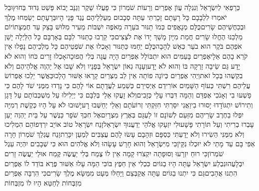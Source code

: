 \documentclass[../main/main.tex]{subfiles}
\begin{document}
\begin{multicols*}{\ncols}
כְּרָפְאִי לְיִשְׂרָאֵל וְנִגְלָה עֲוֺן אֶפְרַיִם וְרָעוֹת שֹׁמְרוֹן כִּי פָעֲלוּ שָׁקֶר וְגַנָּב יָבוֹא פָּשַׁט גְּדוּד בַּחוּץ\PreVerseSpace{}וּבַל יֹאמְרוּ לִלְבָבָם כָּל רָעָתָם זָכָרְתִּי עַתָּה סְבָבוּם מַעַלְלֵיהֶם נֶגֶד פָּנַי הָיוּ\PreVerseSpace{}בְּרָעָתָם יְשַׂמְּחוּ מֶלֶךְ וּבְכַחֲשֵׁיהֶם שָׂרִים\PreVerseSpace{}כֻּלָּם מְנָאֲפִים כְּמוֹ תַנּוּר בֹּעֵרָה מֵאֹפֶה יִשְׁבּוֹת מֵעִיר מִלּוּשׁ בָּצֵק עַד חֻמְצָתוֹ\PreVerseSpace{}יוֹם מַלְכֵּנוּ הֶחֱלוּ שָׂרִים חֲמַת מִיָּיִן מָשַׁךְ יָדוֹ אֶת לֹצְצִים\PreVerseSpace{}כִּי קֵרְבוּ כַתַּנּוּר לִבָּם בְּאָרְבָּם כָּל הַלַּיְלָה יָשֵׁן אֹפֵהֶם בֹּקֶר הוּא בֹעֵר כְּאֵשׁ לֶהָבָה\PreVerseSpace{}כֻּלָּם יֵחַמּוּ כַּתַּנּוּר וְאָכְלוּ אֶת שֹׁפְטֵיהֶם כָּל מַלְכֵיהֶם נָפָלוּ אֵין קֹרֵא בָהֶם אֵלָי\PreVerseSpace{}אֶפְרַיִם בָּעַמִּים הוּא יִתְבּוֹלָל אֶפְרַיִם הָיָה עֻגָה בְּלִי הֲפוּכָה\PreVerseSpace{}אָכְלוּ זָרִים כֹּחוֹ וְהוּא לֹא יָדָע גַּם שֵׂיבָה זָרְקָה בּוֹ וְהוּא לֹא יָדָע\PreVerseSpace{}וְעָנָה גְאוֹן יִשְׂרָאֵל בְּפָנָיו וְלֹא שָׁבוּ אֶל יַהְוֶה אֱלֹהֵיהֶם וְלֹא בִקְשֻׁהוּ בְּכָל זֹאת\PreVerseSpace{}וַיְהִי אֶפְרַיִם כְּיוֹנָה פוֹתָה אֵין לֵב מִצְרַיִם קָרָאוּ אַשּׁוּר הָלָכוּ\PreVerseSpace{}כַּאֲשֶׁר יֵלֵכוּ אֶפְרוֹשׂ עֲלֵיהֶם רִשְׁתִּי כְּעוֹף הַשָּׁמַיִם אוֹרִידֵם אַיְסִירֵם כְּשֵׁמַע לַעֲדָתָם \ClosedSection{}אוֹי לָהֶם כִּי נָדְדוּ מִמֶּנִּי שֹׁד לָהֶם כִּי פָשְׁעוּ בִי וְאָנֹכִי אֶפְדֵּם וְהֵמָּה דִּבְּרוּ עָלַי כְּזָבִים\PreVerseSpace{}וְלֹא זָעֲקוּ אֵלַי בְּלִבָּם כִּי יְיֵלִילוּ עַל מִשְׁכְּבוֹתָם עַל דָּגָן וְתִירוֹשׁ יִתְגּוֹדָדוּ\SubEnd{} יָסוּרוּ בִי\PreVerseSpace{}וַאֲנִי יִסַּרְתִּי חִזַּקְתִּי זְרוֹעֹתָם וְאֵלַי יְחַשְּׁבוּ רָע\PreVerseSpace{}יָשׁוּבוּ לֹא עָל הָיוּ כְּקֶשֶׁת רְמִיָּה יִפְּלוּ בַחֶרֶב שָׂרֵיהֶם מִזַּעַם לְשׁוֹנָם זוֹ לַעְגָּם בְּאֶרֶץ מִצְרָיִם\PreChapterSpace{}אֶל חִכְּךָ שֹׁפָר כַּנֶּשֶׁר עַל בֵּית יַהְוֶה יַעַן עָבְרוּ בְרִיתִי וְעַל תּוֹרָתִי פָּשָׁעוּ\PreVerseSpace{}לִי יִזְעָקוּ אֱלֹהַי יְדַעֲנוּךָ יִשְׂרָאֵל\PreVerseSpace{}זָנַח יִשְׂרָאֵל טוֹב אוֹיֵב יִרְדְּפוֹ\PreVerseSpace{}הֵם הִמְלִיכוּ וְלֹא מִמֶּנִּי הֵשִׂירוּ וְלֹא יָדָעְתִּי כַּסְפָּם וּזְהָבָם עָשׂוּ לָהֶם עֲצַבִּים לְמַעַן יִכָּרֵת\PreVerseSpace{}זָנַח עֶגְלֵךְ שֹׁמְרוֹן חָרָה אַפִּי בָּם עַד מָתַי לֹא יוּכְלוּ נִקָּיֹן\PreVerseSpace{}כִּי מִיִּשְׂרָאֵל וְהוּא חָרָשׁ עָשָׂהוּ וְלֹא אֱלֹהִים הוּא כִּי שְׁבָבִים יִהְיֶה עֵגֶל שֹׁמְרוֹן\PreVerseSpace{}כִּי רוּחַ יִזְרָעוּ וְסוּפָתָה יִקְצֹרוּ קָמָה אֵין לוֹ צֶמַח בְּלִי יַעֲשֶׂה קֶּמַח אוּלַי יַעֲשֶׂה זָרִים יִבְלָעֻהוּ\PreVerseSpace{}נִבְלַע יִשְׂרָאֵל עַתָּה הָיוּ בַגּוֹיִם כִּכְלִי אֵין חֵפֶץ בּוֹ\PreVerseSpace{}כִּי הֵמָּה עָלוּ אַשּׁוּר פֶּרֶא בּוֹדֵד לוֹ אֶפְרַיִם הִתְנוּ אֲהָבִים\PreVerseSpace{}גַּם כִּי יִתְנוּ בַגּוֹיִם עַתָּה אֲקַבְּצֵם וַיָּחֵלּוּ מְּעָט מִמַּשָּׂא מֶלֶךְ שָׂרִים\PreVerseSpace{}כִּי הִרְבָּה אֶפְרַיִם מִזְבְּחוֹת לְחַטֵּא\SubEnd{} הָיוּ לוֹ מִזְבְּחוֹת 
\end{multicols*}
\end{document}
